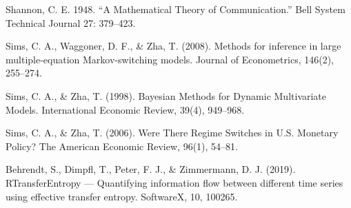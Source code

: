 \documentclass[
]{article}
\begin{document}
Shannon, C. E. 1948. ``A Mathematical Theory of Communication.'' Bell
System Technical Journal 27: 379--423.

Sims, C. A., Waggoner, D. F., \& Zha, T. (2008). Methods for inference
in large multiple-equation Markov-switching models. Journal of
Econometrics, 146(2), 255--274.

Sims, C. A., \& Zha, T. (1998). Bayesian Methods for Dynamic
Multivariate Models. International Economic Review, 39(4), 949--968.

Sims, C. A., \& Zha, T. (2006). Were There Regime Switches in U.S.
Monetary Policy? The American Economic Review, 96(1), 54--81.

Behrendt, S., Dimpfl, T., Peter, F. J., \& Zimmermann, D. J. (2019).
RTransferEntropy --- Quantifying information flow between different time
series using effective transfer entropy. SoftwareX, 10, 100265.
\end{document}
